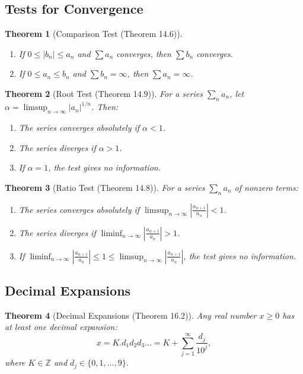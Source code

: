 \documentclass[9pt]{article}
\theoremstyle{definition}
\theoremstyle{plain}
\newtheorem{theorem}{Theorem}
\begin{document}
\subsection*{Tests for Convergence}
\begin{theorem}[Comparison Test (Theorem 14.6)]
\leavevmode
\begin{enumerate}
    \item If \( 0 \leq |b_n| \leq a_n \) and \( \sum a_n \) converges, then \( \sum b_n \) converges.
    \item If \( 0 \leq a_n \leq b_n \) and \( \sum b_n = \infty \), then \( \sum a_n = \infty \).
\end{enumerate}
\end{theorem}

\begin{theorem}[Root Test (Theorem 14.9)]
For a series \( \sum_n a_n \), let \( \alpha = \limsup_{n \to \infty} |a_n|^{1/n} \). Then:
\begin{enumerate}
    \item The series converges absolutely if \( \alpha < 1 \).
    \item The series diverges if \( \alpha > 1 \).
    \item If \( \alpha = 1 \), the test gives no information.
\end{enumerate}
\end{theorem}

\begin{theorem}[Ratio Test (Theorem 14.8)]
For a series \( \sum_n a_n \) of nonzero terms:
\begin{enumerate}
    \item The series converges absolutely if \( \limsup_{n \to \infty} \left|\frac{a_{n+1}}{a_n}\right| < 1 \).
    \item The series diverges if \( \liminf_{n \to \infty} \left|\frac{a_{n+1}}{a_n}\right| > 1 \).
    \item If \( \liminf_{n \to \infty} \left|\frac{a_{n+1}}{a_n}\right| \leq 1 \leq \limsup_{n \to \infty} \left|\frac{a_{n+1}}{a_n}\right| \), the test gives no information.
\end{enumerate}
\end{theorem}

\subsection*{Decimal Expansions}
\begin{theorem}[Decimal Expansions (Theorem 16.2)]
Any real number \( x \geq 0 \) has at least one decimal expansion:
\[
x = K.d_1d_2d_3\ldots = K + \sum_{j=1}^\infty \frac{d_j}{10^j},
\]
where \( K \in \mathbb{Z} \) and \( d_j \in \{0, 1, \ldots, 9\} \).
\end{theorem}
\end{document}
